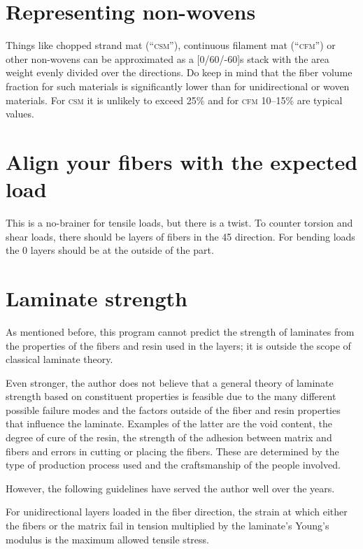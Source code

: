 \documentclass[a4paper,landscape,oneside,11pt,twocolumn]{memoir}
\begin{document}
\section{Representing non-wovens}

Things like chopped strand mat (“\textsc{csm}”), continuous filament mat
(“\textsc{cfm}”) or other non-wovens can be approximated as
a [0\textdegree/60\textdegree/-60\textdegree]s stack with the area weight
evenly divided over the directions. Do keep in mind that the fiber volume
fraction for such materials is significantly lower than for unidirectional or
woven materials. For \textsc{csm} it is unlikely to exceed 25\% and for
\textsc{cfm} 10--15\% are typical values.


\section{Align your fibers with the expected load}

This is a no-brainer for tensile loads, but there is a twist. To counter
torsion and shear loads, there should be layers of fibers in the \textpm{}
45\textdegree{} direction.  For bending loads the 0\textdegree{} layers should
be at the outside of the part.


\section{Laminate strength}

As mentioned before, this program cannot predict the strength of laminates
from the properties of the fibers and resin used in the layers; it is outside
the scope of classical laminate theory.

Even stronger, the author does not believe that a general theory of laminate
strength based on constituent properties is feasible due to the many different
possible failure modes and the factors outside of the fiber and resin
properties that influence the laminate.  Examples of the latter are the void
content, the degree of cure of the resin, the strength of the adhesion between
matrix and fibers and errors in cutting or placing the fibers.
These are determined by the type of production process used and the craftsmanship
of the people involved.

However, the following guidelines have served the author well over the years.

For unidirectional layers loaded in the fiber direction, the strain at which
either the fibers or the matrix fail in tension multiplied by the laminate's
Young's modulus is the maximum allowed tensile stress.
\end{document}
